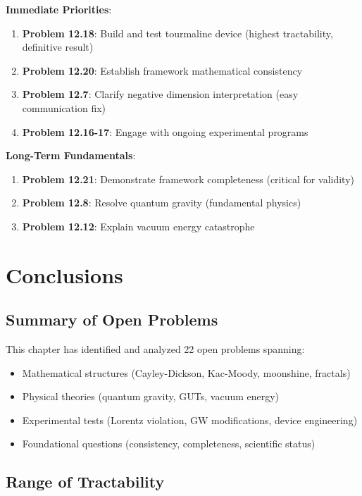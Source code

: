 \textbf{Immediate Priorities}:
\begin{enumerate}
    \item \textbf{Problem 12.18}: Build and test tourmaline device (highest tractability, definitive result)
    \item \textbf{Problem 12.20}: Establish framework mathematical consistency
    \item \textbf{Problem 12.7}: Clarify negative dimension interpretation (easy communication fix)
    \item \textbf{Problem 12.16-17}: Engage with ongoing experimental programs
\end{enumerate}

\textbf{Long-Term Fundamentals}:
\begin{enumerate}
    \item \textbf{Problem 12.21}: Demonstrate framework completeness (critical for validity)
    \item \textbf{Problem 12.8}: Resolve quantum gravity (fundamental physics)
    \item \textbf{Problem 12.12}: Explain vacuum energy catastrophe
\end{enumerate}

\section{Conclusions}

\subsection{Summary of Open Problems}

This chapter has identified and analyzed 22 open problems spanning:
\begin{itemize}
    \item Mathematical structures (Cayley-Dickson, Kac-Moody, moonshine, fractals)
    \item Physical theories (quantum gravity, GUTs, vacuum energy)
    \item Experimental tests (Lorentz violation, GW modifications, device engineering)
    \item Foundational questions (consistency, completeness, scientific status)
\end{itemize}

\subsection{Range of Tractability}


